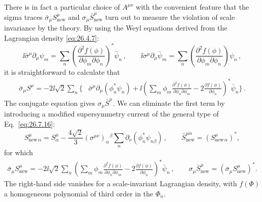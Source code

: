 There is in fact a particular choice of \(A^{\mu\nu}\) with the convenient
feature that the sigma traces
\(\bar\sigma_\mu S_{\mathrm{new}}^\mu\) and
\(\sigma_\mu\bar S_{\mathrm{new}}^\mu\) turn out to measure the violation of
scale invariance by the theory. By using the Weyl equations
derived from the Lagrangian density \eqref{eq:26.4.7}:
\begin{equation}
  \ii\bar\sigma^\mu\partial_\mu\psi_m
  =\sum_n
   \left(
    \frac{\partial^2f(\phi)}{\partial\phi_m\partial\phi_n}
   \right)^*\bar\psi_n\,,
  \qquad
  \ii\sigma^\mu\partial_\mu\bar\psi_m
  =\sum_n
   \left(
    \frac{\partial^2f(\phi)}{\partial\phi_m\partial\phi_n}
   \right)\psi_n\,,
  \tag{26.7.17}\label{eq:26.7.17}
\end{equation}
it is straightforward to calculate that
\[
  \begin{aligned}
  \bar\sigma_\mu S^\mu
  =-2\ii\sqrt{2}\sum_n\biggl\{
    &\bar\sigma^\mu\partial_\mu(\phi_n^*\psi_n)
    +\ii\left(
      \sum_m\phi_m
       \frac{\partial^2f(\phi)}{\partial\phi_n\partial\phi_m}
      -2\frac{\partial f(\phi)}{\partial\phi_n}
     \right)^*\bar\psi_n
  \biggr\}\,.
  \end{aligned}
\]
The conjugate equation gives \(\sigma_\mu\bar S^\mu\).
We can eliminate the first term by introducing a modified supersymmetry
current of the general type of Eq.~\eqref{eq:26.7.16}:
\begin{equation}
  S_{\mathrm{new}\,\alpha}^\mu
  =S^\mu_\alpha-\frac{4\sqrt{2}}{3}
   (\sigma^{\mu\nu})_\alpha{}^\beta
   \sum_n\partial_\nu(\phi_n^*\psi_{n\beta})\,,
  \qquad
  \bar S_{\mathrm{new}}^{\mu\dot\alpha}
  =(S_{\mathrm{new}\,\alpha}^\mu)^* ,
  \tag{26.7.18}\label{eq:26.7.18}
\end{equation}
for which
\begin{equation}
  \begin{aligned}
  \bar\sigma_\mu S_{\mathrm{new}}^\mu
  =-2\ii\sqrt{2}\sum_n
    \left(
      \sum_m\phi_m
       \frac{\partial^2f(\phi)}{\partial\phi_n\partial\phi_m}
      -2\frac{\partial f(\phi)}{\partial\phi_n}
     \right)^*\bar\psi_n\,,
  \qquad
  \sigma_\mu\bar S_{\mathrm{new}}^\mu
  =(\bar\sigma_\mu S_{\mathrm{new}}^\mu)^* .
  \end{aligned}
  \tag{26.7.19}\label{eq:26.7.19}
\end{equation}
The right-hand side vanishes for a scale-invariant Lagrangian density, with
\(f(\Phi)\) a homogeneous polynomial of third order in the \(\Phi_n\).

